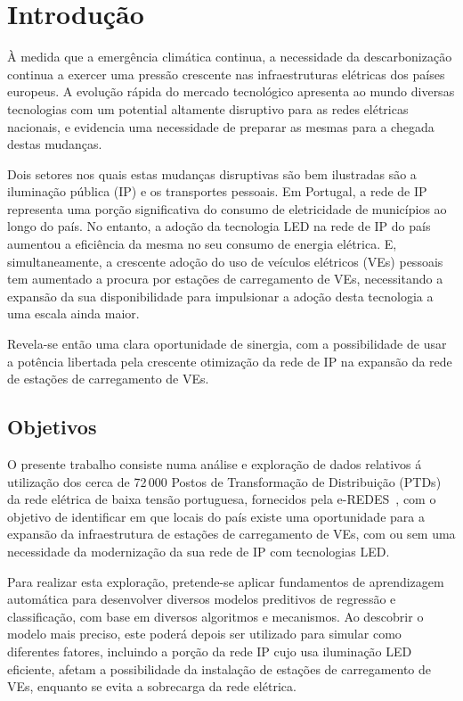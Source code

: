 \documentclass[conference]{IEEEtran}
\begin{document}
\section{Introdução}

À medida que a emergência climática continua, a necessidade da descarbonização continua a exercer uma pressão crescente nas infraestruturas elétricas dos países europeus. A evolução rápida do mercado tecnológico apresenta ao mundo diversas tecnologias com um potential altamente disruptivo para as redes elétricas nacionais, e evidencia uma necessidade de preparar as mesmas para a chegada destas mudanças.

Dois setores nos quais estas mudanças disruptivas são bem ilustradas são a iluminação pública (IP) e os transportes pessoais. Em Portugal, a rede de IP representa uma porção significativa do consumo de eletricidade de municípios ao longo do país. No entanto, a adoção da tecnologia LED na rede de IP do país aumentou a eficiência da mesma no seu consumo de energia elétrica. E, simultaneamente, a crescente adoção do uso de veículos elétricos (VEs) pessoais tem aumentado a procura por estações de carregamento de VEs, necessitando a expansão da sua disponibilidade para impulsionar a adoção desta tecnologia a uma escala ainda maior.

Revela-se então uma clara oportunidade de sinergia, com a possibilidade de usar a potência libertada pela crescente otimização da rede de IP na expansão da rede de estações de carregamento de VEs.

\subsection{Objetivos}

O presente trabalho consiste numa análise e exploração de dados relativos á utilização dos cerca de 72\,000 Postos de Transformação de Distribuição (PTDs) da rede elétrica de baixa tensão portuguesa, fornecidos pela e-REDES~\cite{eredes}, com o objetivo de identificar em que locais do país existe uma oportunidade para a expansão da infraestrutura de estações de carregamento de VEs, com ou sem uma necessidade da modernização da sua rede de IP com tecnologias LED.

Para realizar esta exploração, pretende-se aplicar fundamentos de aprendizagem automática para desenvolver diversos modelos preditivos de regressão e classificação, com base em diversos algoritmos e mecanismos. Ao descobrir o modelo mais preciso, este poderá depois ser utilizado para simular como diferentes fatores, incluindo a porção da rede IP cujo usa iluminação LED eficiente, afetam a possibilidade da instalação de estações de carregamento de VEs, enquanto se evita a sobrecarga da rede elétrica.
\end{document}

